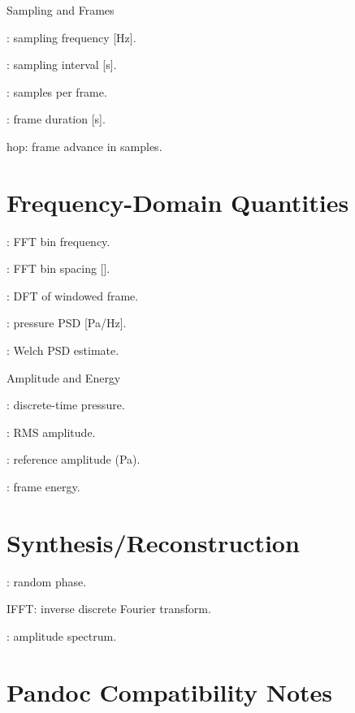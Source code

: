 \documentclass[12pt]{article}
\begin{document}
Sampling and Frames

: sampling frequency [Hz].

: sampling interval  [s].

: samples per frame.

: frame duration [s].

hop: frame advance in samples.

\section*{Frequency-Domain Quantities}
: FFT bin frequency.

: FFT bin spacing [].

: DFT of windowed frame.

: pressure PSD [Pa/Hz].

: Welch PSD estimate.

Amplitude and Energy

: discrete-time pressure.

: RMS amplitude.

: reference amplitude (Pa).

: frame energy.

\section*{Synthesis/Reconstruction}
: random phase.

IFFT: inverse discrete Fourier transform.

: amplitude spectrum.

\section*{Pandoc Compatibility Notes}
\end{document}
